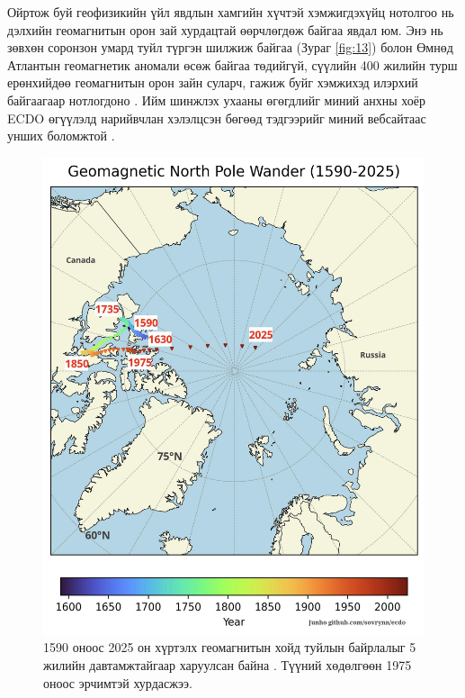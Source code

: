\documentclass[10pt,twocolumn,letterpaper]{article}
\begin{document}
Ойртож буй геофизикийн үйл явдлын хамгийн хүчтэй хэмжигдэхүйц нотолгоо нь дэлхийн геомагнитын орон зай хурдацтай өөрчлөгдөж байгаа явдал юм. Энэ нь зөвхөн соронзон умард туйл түргэн шилжиж байгаа (Зураг \ref{fig:13}) болон Өмнөд Атлантын геомагнетик аномали өсөж байгаа төдийгүй, сүүлийн 400 жилийн турш ерөнхийдөө геомагнитын орон зайн суларч, гажиж буйг хэмжихэд илэрхий байгаагаар нотлогдоно \cite{3}. Ийм шинжлэх ухааны өгөгдлийг миний анхны хоёр ECDO өгүүлэлд нарийвчлан хэлэлцсэн бөгөөд тэдгээрийг миний вебсайтаас унших боломжтой \cite{3}.

\begin{figure}[t]
\begin{center}
   \includegraphics[width=1\linewidth]{npw.jpg}
\end{center}
   \caption{1590 оноос 2025 он хүртэлх геомагнитын хойд туйлын байрлалыг 5 жилийн давтамжтайгаар харуулсан байна \cite{41}. Түүний хөдөлгөөн 1975 оноос эрчимтэй хурдасжээ.}
\label{fig:13}
\label{fig:onecol}
\end{figure}
\end{document}

